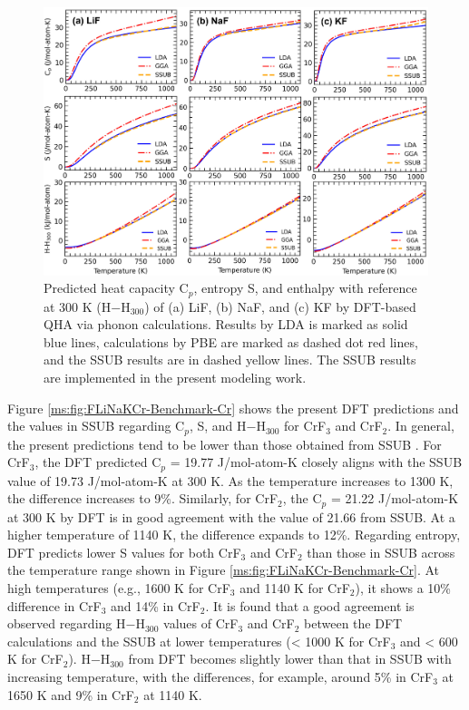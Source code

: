 \begin{figure}[ht]
    \centering
    \includegraphics[width=1\linewidth]{moltensalts/Moltensalts-FLiNaKCr-Benchmark.jpg}
    \caption{Predicted heat capacity C$_p$, entropy S, and enthalpy with reference at 300 K (H$-$H$_{300}$) of (a) LiF, (b) NaF, and (c) KF by DFT-based QHA via phonon calculations. Results by LDA is marked as solid blue lines, calculations by PBE are marked as dashed dot red lines, and the SSUB results \cite{sgteurl} are in dashed yellow lines. The SSUB results are implemented in the present modeling work.}
    \label{ms:fig:FLiNaKCr-Benchmark}
\end{figure}

Figure \ref{ms:fig:FLiNaKCr-Benchmark-Cr} shows the present DFT predictions and the values in SSUB \cite{sgteurl} regarding C$_p$, S, and H$-$H$_{300}$ for CrF$_3$ and CrF$_2$. In general, the present predictions tend to be lower than those obtained from SSUB \cite{sgteurl}. For CrF$_3$, the DFT predicted C$_p$ = 19.77 J/mol-atom-K closely aligns with the SSUB value of 19.73 J/mol-atom-K at 300 K. As the temperature increases to 1300 K, the difference increases to 9\%. Similarly, for CrF$_2$, the C$_p$ = 21.22 J/mol-atom-K at 300 K by DFT is in good agreement with the value of 21.66 from SSUB. At a higher temperature of 1140 K, the difference expands to 12\%. Regarding entropy, DFT predicts lower S values for both CrF$_3$ and CrF$_2$ than those in SSUB across the temperature range shown in Figure \ref{ms:fig:FLiNaKCr-Benchmark-Cr}. At high temperatures (e.g., 1600 K for CrF$_3$ and 1140 K for CrF$_2$), it shows a 10\% difference in CrF$_3$ and 14\% in CrF$_2$. It is found that a good agreement is observed regarding H$-$H$_{300}$ values of CrF$_3$ and CrF$_2$ between the DFT calculations and the SSUB at lower temperatures (< 1000 K for CrF$_3$ and < 600 K for CrF$_2$). H$-$H$_{300}$ from DFT becomes slightly lower than that in SSUB \cite{sgteurl} with increasing temperature, with the differences, for example, around 5\% in CrF$_3$ at 1650 K and 9\% in CrF$_2$ at 1140 K.


